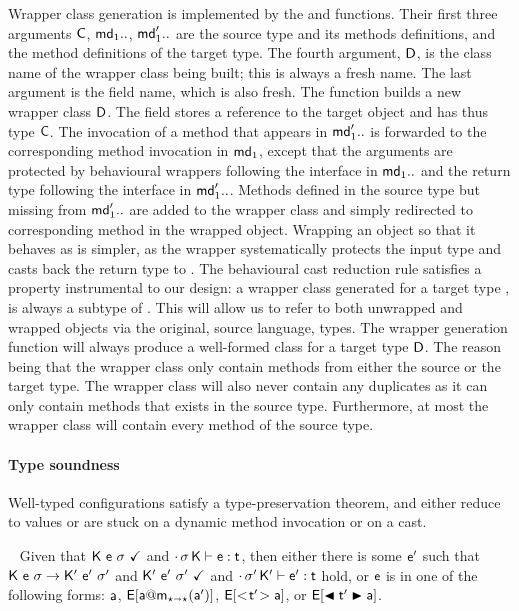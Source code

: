 \documentclass[acmlarge, anonymous, authordraft, review]{acmart} %
\begin{document}
Wrapper class generation is implemented by the  and 
functions. Their first three arguments \(\C\), \(\md[1]..\), \(\mdp[1]..\) are
the source type and its methods definitions, and the method definitions of
the target type. The fourth argument, \(\D\), is the class name of the
wrapper class being built; this is always a fresh name. The last argument is
the \that field name, which is also fresh.  The function builds a new
wrapper class \(\D\).  The field \that stores a reference to the target
object and has thus type \(\C\).  The invocation of a method that appears in
\(\mdp[1]..\) is forwarded to the corresponding method invocation in \(\md[1]\), except that the arguments are protected by behavioural wrappers
following the interface in \(\md[1]..\) and the return type following the
interface in \(\mdp[1]..\).  Methods defined in the source type but missing
from \(\mdp[1]..\) are added to the wrapper class and simply redirected to
corresponding method in the wrapped object.  Wrapping an object so that it
behaves as \any is simpler, as the wrapper systematically protects the input
type and casts back the return type to \any.  The behavioural cast reduction
rule satisfies a property instrumental to our design: a wrapper class
generated for a target type \D, is always a subtype of \D.  This will allow
us to refer to both unwrapped and wrapped objects via the original, source
language, types. The wrapper generation function will always produce a
well-formed class for a target type $\D$. The reason being that the wrapper
class only contain methods from either the source or the target type. The
wrapper class will also never contain any duplicates as it can only contain
methods that exists in the source type.  Furthermore, at most the wrapper
class will contain every method of the source type.

\paragraph{Type soundness} 
Well-typed \kafka configurations satisfy a type-preservation theorem, and
either reduce to values or are stuck on a dynamic method invocation or on a
cast.  

\medskip{} ~
Given that $\WFp\K{\e~\s}$ and $\EnvType\cdot\s\K\e\t$,
then either there is some $\ep$ such that $\Reduce \K\e\s \Kp\ep\sp$ and
$\WFp\Kp{\ep~\sp}$ and $\EnvType\cdot\sp\Kp\ep\t$ hold, or $\e$ is in one of
the following forms: $\a$, $\EE[\DynCall\a\m{\ap}]$, $\EE[\SubCast\tp\a]$,
or $\EE[\BehCast\tp\a]$.\\
\end{document}
